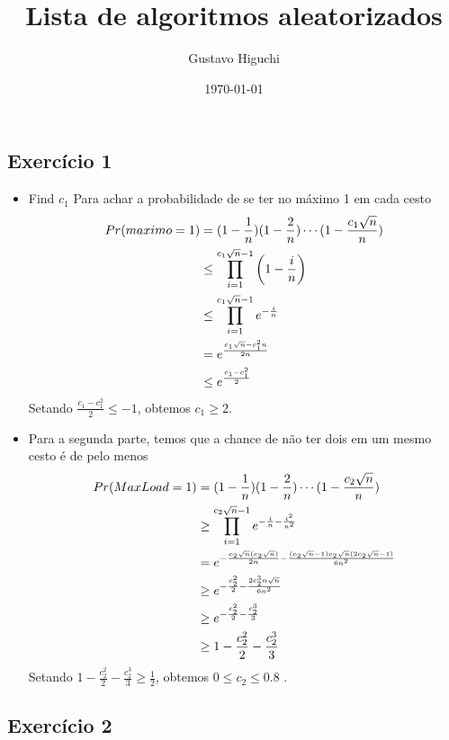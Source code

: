 \documentclass{article}
\title{Lista de algoritmos aleatorizados}
\author{Gustavo Higuchi}
\date{\today}
\begin{document}
\maketitle

\tableofcontents
\newpage


\chapter{}
\section{Exercício 1}


\begin{itemize}
    \item Find $c_1$
    Para achar a probabilidade de se ter no máximo 1 em cada cesto
    \begin{equation}
    \notag
        \begin{split}
        Pr(maximo=1) &= (1-\frac{1}{n})(1-\frac{2}{n})\cdots (1-\frac{c_1\sqrt{n}}{n}) \\
        &\le \prod_{i=1}^{c_1\sqrt{n}-1} \left(1 - \dfrac{i}{n}\right) \\
        &\le \prod_{i=1}^{c_1\sqrt{n}-1} e^{-\frac{i}{n}} \\
        &= e^{\frac{c_1\sqrt{n}-c_1^2n}{2n}} \\
        &\le e^{\frac{c_1-c_1^2}{2}}
        \end{split}
    \end{equation}
    Setando $\frac{c_1-c_1^2}{2} \le -1$, obtemos $c_1 \ge 2$.
    \item
    Para a segunda parte, temos que a chance de não ter dois em um mesmo cesto é de pelo 
    menos
    \begin{equation}
    \notag
        \begin{split}
        Pr(MaxLoad=1) &= (1-\frac{1}{n})(1-\frac{2}{n})\cdots (1-\frac{c_2\sqrt{n}}{n}) \\
        &\ge \prod_{i=1}^{c_2\sqrt{n}-1} e^{-\frac{i}{n}-\frac{i^2}{n^2}} \\
        &= e^{ -\frac{c_2\sqrt{n}(c_2\sqrt{n})}{2n} -\frac{(c_2\sqrt{n}-1)c_2\sqrt{n}(2c_2\sqrt{n}-1)}{6n^2}} \\
        &\ge e^{ -\frac{c_2^2}{2} -\frac{2c_2^3n\sqrt{n}}{6n^2} } \\
        &\ge e^{ -\frac{c_2^2}{2} -\frac{c_2^3}{3} } \\
        &\ge 1 -\frac{c_2^2}{2} -\frac{c_2^3}{3}
        \end{split}
    \end{equation}
    Setando $1 -\frac{c_2^2}{2} -\frac{c_2^3}{3} \ge \frac{1}{2}$, obtemos $0 \le c_2 \le 0.8$ .
\end{itemize}

\section{Exercício 2}
\end{document}
